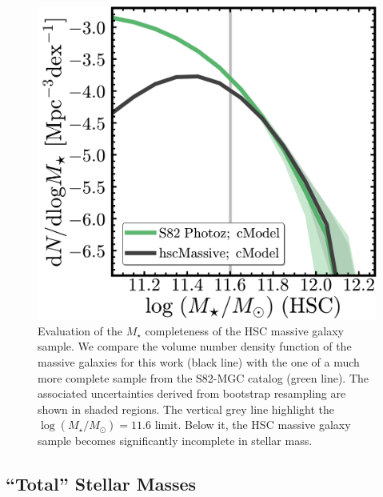 \documentclass[a4paper,fleqn,usenatbib]{mnras}
\def\mstar{{$M_{\star}$}}
\def\logms{{$\log (M_{\star}/M_{\odot})$}}
\begin{document}

  \begin{figure}
      \centering 
      \includegraphics[width=\columnwidth]{fig/redbcg_completeness}
      \caption{
          Evaluation of the \mstar{} completeness of the HSC massive galaxy sample.
          We compare the volume number density function of the massive galaxies 
          for this work (black line) with the one of a much more complete sample
          from the S82-MGC catalog (green line).  
          The associated uncertainties derived from bootstrap resampling are shown in 
          shaded regions. 
          The vertical grey line highlight the \logms{}$=11.6$ limit.  
          Below it, the HSC massive galaxy sample becomes significantly incomplete in 
          stellar mass. 
          }
      \label{fig:mass_complete}
  \end{figure}     

\subsection{``Total'' Stellar Masses}
    \label{ssec:mtotal}
    
\end{document}
